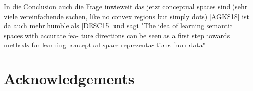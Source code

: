 \documentclass[11pt,
  paper=a4, 
  twoside,  %
  hidelinks,
  bibliography=totocnumbered,
	captions=tableheading,
	BCOR=10mm
]{scrreprt}
\theoremstyle{definition}
\begin{document}
In die Conclusion auch die Frage inwieweit das jetzt conceptual spaces sind (sehr viele vereinfachende sachen, like no convex regions but simply dots)
[AGKS18] ist da auch mehr humble als [DESC15] und sagt "The idea of learning semantic spaces with accurate fea- ture directions can be seen as a first step towards methods for learning conceptual space representa- tions from data"


\chapter*{Acknowledgements}



\glsaddall
\printglossaries %

	
	\appendix %
	
	
	
	


\printbibliography[heading=bibintoc]
\end{document}
